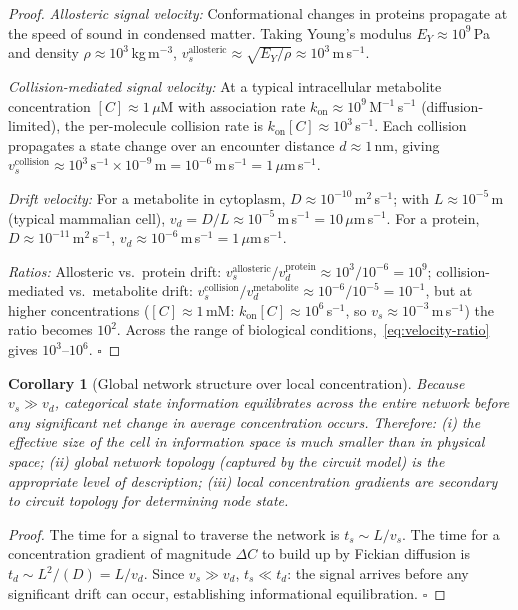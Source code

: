 \documentclass[twocolumn,10pt,a4paper]{article}
\newtheorem{corollary}[theorem]{Corollary}
\begin{document}
\begin{proof}
\emph{Allosteric signal velocity:}  Conformational changes in proteins
propagate at the speed of sound in condensed matter.  Taking Young's modulus
$E_Y\approx 10^9$\,Pa and density $\rho\approx 10^3$\,kg\,m$^{-3}$,
$v_s^{\mathrm{allosteric}}\approx\sqrt{E_Y/\rho}\approx 10^3$\,m\,s$^{-1}$.

\emph{Collision-mediated signal velocity:}  At a typical intracellular
metabolite concentration $[C]\approx 1\,\mu$M with association rate
$k_{\mathrm{on}}\approx 10^9$\,M$^{-1}$\,s$^{-1}$ (diffusion-limited), the
per-molecule collision rate is $k_{\mathrm{on}}[C]\approx 10^3$\,s$^{-1}$.
Each collision propagates a state change over an encounter distance
$d\approx 1$\,nm, giving $v_s^{\mathrm{collision}}\approx
10^3\,\mathrm{s}^{-1}\times 10^{-9}\,\mathrm{m}=10^{-6}$\,m\,s$^{-1}=
1\,\mu$m\,s$^{-1}$.

\emph{Drift velocity:}  For a metabolite in cytoplasm,
$D\approx 10^{-10}$\,m$^2$\,s$^{-1}$; with $L\approx 10^{-5}$\,m
(typical mammalian cell), $v_d=D/L\approx 10^{-5}$\,m\,s$^{-1}=10\,\mu$m\,s$^{-1}$.
For a protein, $D\approx 10^{-11}$\,m$^2$\,s$^{-1}$,
$v_d\approx 10^{-6}$\,m\,s$^{-1}=1\,\mu$m\,s$^{-1}$.

\emph{Ratios:}  Allosteric vs.\ protein drift:
$v_s^{\mathrm{allosteric}}/v_d^{\mathrm{protein}}\approx 10^3/10^{-6}=10^9$;
collision-mediated vs.\ metabolite drift:
$v_s^{\mathrm{collision}}/v_d^{\mathrm{metabolite}}\approx
10^{-6}/10^{-5}=10^{-1}$, but at higher concentrations
($[C]\approx 1$\,mM: $k_{\mathrm{on}}[C]\approx 10^6$\,s$^{-1}$, so
$v_s\approx 10^{-3}$\,m\,s$^{-1}$) the ratio becomes $10^2$.
Across the range of biological conditions,~\eqref{eq:velocity-ratio}
gives $10^3$--$10^6$.  $\square$
\end{proof}

\begin{corollary}[Global network structure over local concentration]
\label{cor:global}
Because $v_s\gg v_d$, categorical state information equilibrates across the
entire network before any significant net change in average concentration
occurs.  Therefore: (i) the effective size of the cell in information space is
much smaller than in physical space; (ii) global network topology (captured by
the circuit model) is the appropriate level of description; (iii) local
concentration gradients are secondary to circuit topology for determining node
state.
\end{corollary}

\begin{proof}
The time for a signal to traverse the network is $t_s\sim L/v_s$.  The time
for a concentration gradient of magnitude $\Delta C$ to build up by Fickian
diffusion is $t_d\sim L^2/(D)=L/v_d$.  Since $v_s\gg v_d$,
$t_s\ll t_d$: the signal arrives before any significant drift can occur,
establishing informational equilibration.  $\square$
\end{proof}
\end{document}
